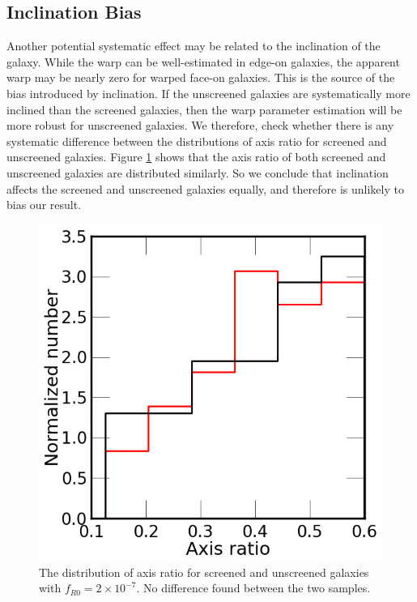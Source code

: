 \documentclass[useAMS,usenatbib,twocolumn]{mn2e}
\begin{document}
\subsection{Inclination Bias}
\label{ap:inclination-systematic}
Another potential systematic
effect may be related to the inclination of the galaxy.
While the warp can be well-estimated in edge-on galaxies,
the apparent warp may be nearly zero for warped face-on galaxies. This is the
source of the bias introduced by inclination.  If the unscreened galaxies
are systematically more inclined than the screened galaxies, then the warp
parameter estimation will be more robust for unscreened galaxies. 
We therefore, check whether there is any systematic difference between the
distributions of axis ratio for screened and unscreened galaxies. Figure
\ref{warp-incl} shows that the axis ratio
of both screened and unscreened galaxies are distributed similarly. So we
conclude that inclination affects the screened and unscreened galaxies
equally, and therefore is unlikely to bias our result.

\begin{figure}
\begin{center}
  \includegraphics[scale=0.4]{figures/axis-ratio-dist.png}
\caption{The distribution of axis ratio for screened and
unscreened galaxies with $f_{R0}=2\times10^{-7}$. No difference found between
the two samples.}
\label{warp-incl}
\end{center}
\end{figure}
\end{document}
